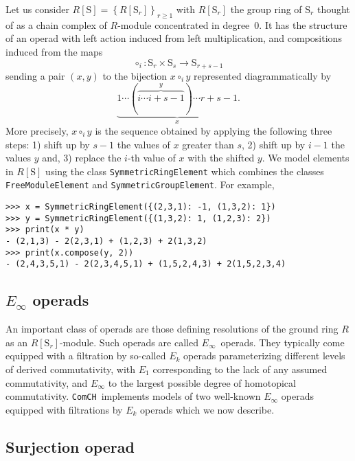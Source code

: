 \documentclass{amsart}
\renewcommand{\S}{\mathrm{S}}
\newcommand{\comch}{\texttt{ComCH}}
\begin{document}
Let us consider $R[\S] = \left\{R[\S_r]\right\}_{r \geq 1}$ with $R[\S_r]$ the group ring of $\S_r$ thought of as a chain complex of $R$-module concentrated in degree~$0$.
It has the structure of an operad with left action induced from left multiplication, and compositions induced from the maps
\begin{equation} \label{eq: compostion of permutations}
\circ_i \colon \S_r \times \S_s \to \S_{r+s-1}
\end{equation}
sending a pair $(x, y)$ to the bijection $x \circ_i y$ represented diagrammatically by
\begin{equation*}
\underbrace{1 \cdots (\overbrace{i \cdots i+s-1}^y) \cdots r+s-1}_x.
\end{equation*}
More precisely, $x \circ_i y$ is the sequence obtained by applying the following three steps: 1) shift up by $s-1$ the values of $x$ greater than $s$, 2) shift up by $i-1$ the values $y$ and, 3) replace the $i$-th value of $x$ with the shifted $y$.
We model elements in $R[\S]$ using the class \texttt{SymmetricRingElement} which combines the classes \texttt{FreeModuleElement} and \texttt{SymmetricGroupElement}.
For example,

\begin{Verbatim}[frame=lines, samepage=true]
>>> x = SymmetricRingElement({(2,3,1): -1, (1,3,2): 1})
>>> y = SymmetricRingElement({(1,3,2): 1, (1,2,3): 2})
>>> print(x * y)
- (2,1,3) - 2(2,3,1) + (1,2,3) + 2(1,3,2)
>>> print(x.compose(y, 2))
- (2,4,3,5,1) - 2(2,3,4,5,1) + (1,5,2,4,3) + 2(1,5,2,3,4)
\end{Verbatim}

\subsection{\texorpdfstring{$E_\infty$}{E-infinity} operads}

An important class of operads are those defining resolutions of the ground ring $R$ as an $R[\S_r]$-module.
Such operads are called \mbox{$E_\infty$ operads}.
They typically come equipped with a filtration by so-called $E_k$ operads parameterizing different levels of derived commutativity, with $E_1$ corresponding to the lack of any assumed commutativity, and $E_\infty$ to the largest possible degree of homotopical commutativity.
\comch\, implements models of two well-known $E_\infty$ operads equipped with filtrations by $E_k$ operads which we now describe.

\subsection{Surjection operad}
\end{document}
